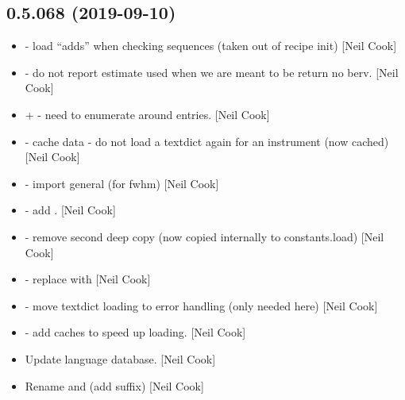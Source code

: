 \documentclass[a4paper,10pt,english]{report}
\begin{document}
\subsection{0.5.068 (2019-09-10)}
\label{\detokenize{misc/changelog:id75}}\begin{itemize}
\item {} 
 - load “adds” when checking
sequences (taken out of recipe init) {[}Neil Cook{]}

\item {} 
 - do not report estimate used when we are
meant to be return no berv. {[}Neil Cook{]}

\item {} 
 +  - need to
enumerate around entries. {[}Neil Cook{]}

\item {} 
 - cache data - do not load a textdict again
for an instrument (now cached) {[}Neil Cook{]}

\item {} 
 - import general (for fwhm) {[}Neil Cook{]}

\item {} 
 - add . {[}Neil
Cook{]}

\item {} 
 - remove second deep copy (now copied internally to
constants.load) {[}Neil Cook{]}

\item {} 
 - replace  with 
{[}Neil Cook{]}

\item {} 
 - move textdict loading to error handling
(only needed here) {[}Neil Cook{]}

\item {} 
 - add caches to speed up loading.
{[}Neil Cook{]}

\item {} 
Update language database. {[}Neil Cook{]}

\item {} 
Rename  and  (add  suffix) {[}Neil Cook{]}


\end{itemize}
\end{document}
